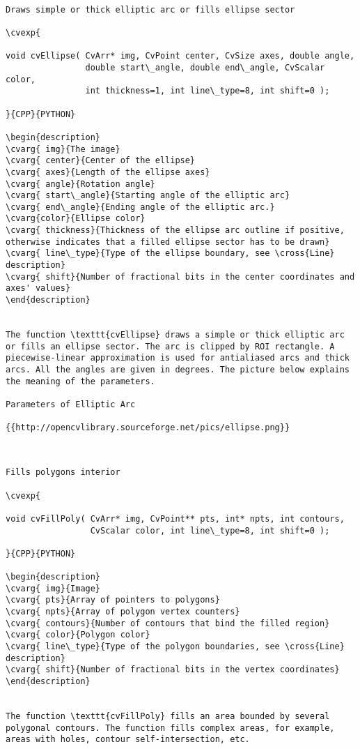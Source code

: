 \begin{verbatim}

Draws simple or thick elliptic arc or fills ellipse sector

\cvexp{

void cvEllipse( CvArr* img, CvPoint center, CvSize axes, double angle,
                double start\_angle, double end\_angle, CvScalar color,
                int thickness=1, int line\_type=8, int shift=0 );

}{CPP}{PYTHON}

\begin{description}
\cvarg{ img}{The image}
\cvarg{ center}{Center of the ellipse}
\cvarg{ axes}{Length of the ellipse axes}
\cvarg{ angle}{Rotation angle}
\cvarg{ start\_angle}{Starting angle of the elliptic arc}
\cvarg{ end\_angle}{Ending angle of the elliptic arc.}
\cvarg{color}{Ellipse color}
\cvarg{ thickness}{Thickness of the ellipse arc outline if positive, otherwise indicates that a filled ellipse sector has to be drawn}
\cvarg{ line\_type}{Type of the ellipse boundary, see \cross{Line} description}
\cvarg{ shift}{Number of fractional bits in the center coordinates and axes' values}
\end{description}


The function \texttt{cvEllipse} draws a simple or thick elliptic arc or fills an ellipse sector. The arc is clipped by ROI rectangle. A piecewise-linear approximation is used for antialiased arcs and thick arcs. All the angles are given in degrees. The picture below explains the meaning of the parameters.

Parameters of Elliptic Arc

{{http://opencvlibrary.sourceforge.net/pics/ellipse.png}}


\end{verbatim}
\begin{verbatim}

Fills polygons interior

\cvexp{

void cvFillPoly( CvArr* img, CvPoint** pts, int* npts, int contours,
                 CvScalar color, int line\_type=8, int shift=0 );

}{CPP}{PYTHON}

\begin{description}
\cvarg{ img}{Image}
\cvarg{ pts}{Array of pointers to polygons}
\cvarg{ npts}{Array of polygon vertex counters}
\cvarg{ contours}{Number of contours that bind the filled region}
\cvarg{ color}{Polygon color}
\cvarg{ line\_type}{Type of the polygon boundaries, see \cross{Line} description}
\cvarg{ shift}{Number of fractional bits in the vertex coordinates}
\end{description}


The function \texttt{cvFillPoly} fills an area bounded by several polygonal contours. The function fills complex areas, for example, areas with holes, contour self-intersection, etc.


\end{verbatim}
